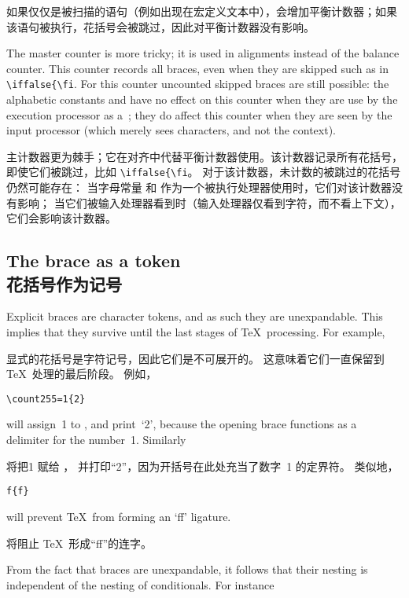 如果仅仅是被扫描的语句（例如出现在宏定义文本中），会增加平衡计数器；如果该语句被执行，花括号会被跳过，因此对平衡计数器没有影响。

The master counter is more tricky;
it is used in alignments instead of the balance counter.
This counter records all braces, even when they are skipped
such as in \verb>\iffalse{\fi>.
For this counter uncounted skipped braces are still possible:
the alphabetic constants  and  have
no effect on this counter when they are
use by the execution processor as a~;
they do affect this counter when they are seen by the 
input processor (which merely sees characters, and not
the context).

主计数器更为棘手；它在对齐中代替平衡计数器使用。该计数器记录所有花括号，即使它们被跳过，比如 \verb>\iffalse{\fi>。
对于该计数器，未计数的被跳过的花括号仍然可能存在：
当字母常量 \n{\lb} 和 \n{\rb} 作为一个被执行处理器使用时，它们对该计数器没有影响；
当它们被输入处理器看到时（输入处理器仅看到字符，而不看上下文），它们会影响该计数器。



\subsection{The brace as a token\\花括号作为记号}

Explicit braces are character tokens, and as such they are
unexpandable. This implies that they survive until the
last stages of \TeX\ processing. For example,

显式的花括号是字符记号，因此它们是不可展开的。
这意味着它们一直保留到 \TeX\ 处理的最后阶段。
例如，
\begin{verbatim}
\count255=1{2}
\end{verbatim}
will assign~1 to ,
and print~`2', because the
opening brace functions as a delimiter for the number~1.
Similarly 

将把1 赋给 ，
并打印“2”，因为开括号在此处充当了数字~1 的定界符。
类似地，\begin{verbatim}
f{f}
\end{verbatim}
will prevent \TeX\ from forming
an `\hbox{ff}' ligature.

将阻止 \TeX\ 形成“ff”的连字。

From the fact that braces are unexpandable,
it follows that their nesting is independent
of the nesting of conditionals. For instance

